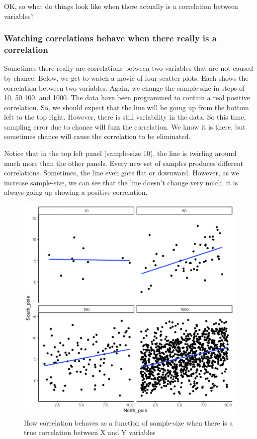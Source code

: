 \documentclass[
]{book}
\begin{document}
OK, so what do things look like when there actually is a correlation between variables?

\hypertarget{watching-correlations-behave-when-there-really-is-a-correlation}{%
\subsubsection{Watching correlations behave when there really is a correlation}\label{watching-correlations-behave-when-there-really-is-a-correlation}}

Sometimes there really are correlations between two variables that are not caused by chance. Below, we get to watch a movie of four scatter plots. Each shows the correlation between two variables. Again, we change the sample-size in steps of 10, 50 100, and 1000. The data have been programmed to contain a real positive correlation. So, we should expect that the line will be going up from the bottom left to the top right. However, there is still variability in the data. So this time, sampling error due to chance will fuzz the correlation. We know it is there, but sometimes chance will cause the correlation to be eliminated.

Notice that in the top left panel (sample-size 10), the line is twirling around much more than the other panels. Every new set of samples produces different correlations. Sometimes, the line even goes flat or downward. However, as we increase sample-size, we can see that the line doesn't change very much, it is always going up showing a positive correlation.

\begin{figure}
\centering
\includegraphics{gifs/corRealgif-1.gif}
\caption{\label{fig:3realcorFour}How correlation behaves as a function of sample-size when there is a true correlation between X and Y variables}
\end{figure}
\end{document}
